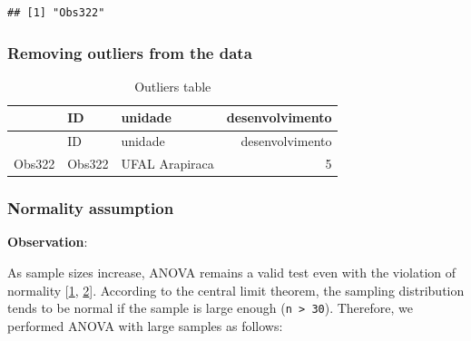\documentclass[]{article}
\newenvironment{Shaded}{\begin{snugshade}}{\end{snugshade}}
\newcommand{\CommentTok}[1]{\textcolor[rgb]{0.56,0.35,0.01}{\textit{#1}}}
\newcommand{\KeywordTok}[1]{\textcolor[rgb]{0.13,0.29,0.53}{\textbf{#1}}}
\newcommand{\NormalTok}[1]{#1}
\newcommand{\OperatorTok}[1]{\textcolor[rgb]{0.81,0.36,0.00}{\textbf{#1}}}
\newcommand{\StringTok}[1]{\textcolor[rgb]{0.31,0.60,0.02}{#1}}
\begin{document}
\begin{verbatim}
## [1] "Obs322"
\end{verbatim}

\hypertarget{removing-outliers-from-the-data}{%
\subsubsection{Removing outliers from the
data}\label{removing-outliers-from-the-data}}

\begin{Shaded}
\end{Shaded}

\begin{longtable}[]{@{}lllr@{}}
\caption{Outliers table}\tabularnewline
\toprule
& ID & unidade & desenvolvimento\tabularnewline
\midrule
\endfirsthead
\toprule
& ID & unidade & desenvolvimento\tabularnewline
\midrule
\endhead
Obs322 & Obs322 & UFAL Arapiraca & 5\tabularnewline
\bottomrule
\end{longtable}

\hypertarget{normality-assumption}{%
\subsubsection{Normality assumption}\label{normality-assumption}}

\textbf{Observation}:

As sample sizes increase, ANOVA remains a valid test even with the
violation of normality {[}\protect\hyperlink{references}{1},
\protect\hyperlink{references}{2}{]}. According to the central limit
theorem, the sampling distribution tends to be normal if the sample is
large enough (\texttt{n\ \textgreater{}\ 30}). Therefore, we performed
ANOVA with large samples as follows:
\end{document}
